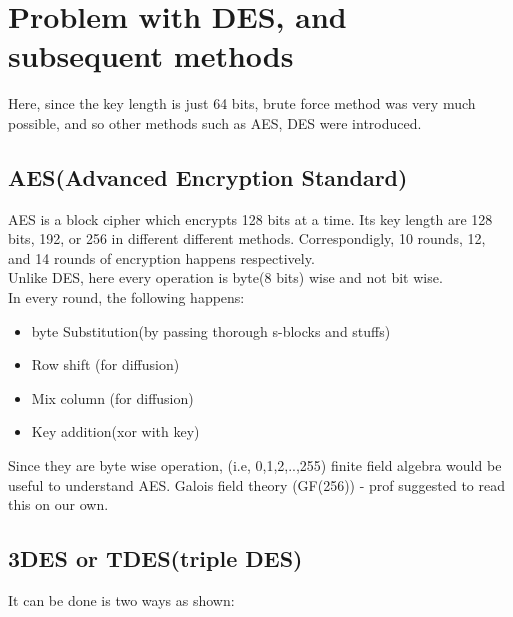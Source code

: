 \documentclass[english, 11pt]{article}
\begin{document}
\section*{Problem with DES, and subsequent methods}
Here, since the key length is just 64 bits, brute force method was very much possible, and so other methods such as AES, DES were introduced.\\
\subsection*{AES(Advanced Encryption Standard)}
AES is a block cipher which encrypts 128 bits at a time. Its key length are 128 bits, 192, or 256 in different different methods. Correspondigly, 10 rounds, 12, and 14 rounds of encryption happens respectively.\\
Unlike  DES, here every operation is byte(8 bits) wise and not bit wise.\\
In every round, the following happens:
\begin{itemize}
  \item byte Substitution(by passing thorough s-blocks and stuffs)
  \item Row shift (for diffusion)
  \item Mix column (for diffusion)
  \item Key addition(xor with key)
\end{itemize}
Since they are byte wise operation, (i.e, {0,1,2,..,255}) finite field algebra would be useful to understand AES.
Galois field theory (GF(256)) - prof suggested to read this on our own.

\subsection*{3DES or TDES(triple DES)}
It can be done is two ways as shown:

\begin{figure}[ht]


  \centering   
\end{figure}
\end{document}
